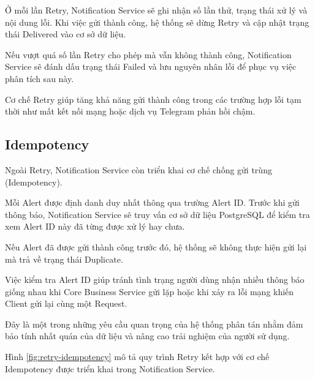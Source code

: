 Ở mỗi lần Retry, Notification Service sẽ ghi nhận số lần thử, trạng thái xử lý và nội dung lỗi. Khi việc gửi thành công, hệ thống sẽ dừng Retry và cập nhật trạng thái Delivered vào cơ sở dữ liệu.

Nếu vượt quá số lần Retry cho phép mà vẫn không thành công, Notification Service sẽ đánh dấu trạng thái Failed và lưu nguyên nhân lỗi để phục vụ việc phân tích sau này.

Cơ chế Retry giúp tăng khả năng gửi thành công trong các trường hợp lỗi tạm thời như mất kết nối mạng hoặc dịch vụ Telegram phản hồi chậm.


\subsection{Idempotency}

Ngoài Retry, Notification Service còn triển khai cơ chế chống gửi trùng (Idempotency).

Mỗi Alert được định danh duy nhất thông qua trường Alert ID. Trước khi gửi thông báo, Notification Service sẽ truy vấn cơ sở dữ liệu PostgreSQL để kiểm tra xem Alert ID này đã từng được xử lý hay chưa.

Nếu Alert đã được gửi thành công trước đó, hệ thống sẽ không thực hiện gửi lại mà trả về trạng thái Duplicate.

Việc kiểm tra Alert ID giúp tránh tình trạng người dùng nhận nhiều thông báo giống nhau khi Core Business Service gửi lặp hoặc khi xảy ra lỗi mạng khiến Client gửi lại cùng một Request.

Đây là một trong những yêu cầu quan trọng của hệ thống phân tán nhằm đảm bảo tính nhất quán của dữ liệu và nâng cao trải nghiệm của người sử dụng.

Hình \ref{fig:retry-idempotency} mô tả quy trình Retry kết hợp với cơ chế Idempotency được triển khai trong Notification Service.

